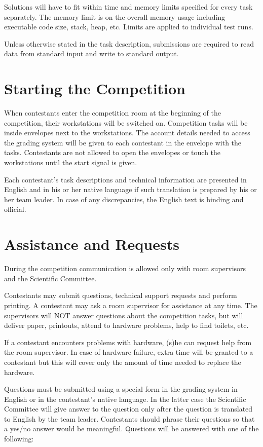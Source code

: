\documentclass[a5paper,10pt,twoside]{book}
\begin{document}
Solutions will have to fit within time and memory limits specified for every
task separately. The memory limit is on the overall memory usage including
executable code size, stack, heap, etc. Limits are applied to individual test
runs.

Unless otherwise stated in the task description, submissions are required to
read data from standard input and write to standard output.

\section{Starting the Competition}

When contestants enter the competition room at the beginning of the competition,
their workstations will be switched on. Competition tasks will be inside
envelopes next to the workstations. The account details needed to access the
grading system will be given to each contestant in the envelope with the tasks.
Contestants are not allowed to open the envelopes or touch the workstations
until the start signal is given.

Each contestant’s task descriptions and technical information are presented in
English and in his or her native language if such translation is prepared by his
or her team leader. In case of any discrepancies, the English text is binding
and official.

\section{Assistance and Requests}

During the competition communication is allowed only with room supervisors and
the Scientific Committee.

Contestants may submit questions, technical support requests and perform
printing. A contestant may ask a room supervisor for assistance at any time. The
supervisors will NOT answer questions about the competition tasks, but will
deliver paper, printouts, attend to hardware problems, help to find toilets,
etc.

If a contestant encounters problems with hardware, (s)he can request help from
the room supervisor. In case of hardware failure, extra time will be granted to
a contestant but this will cover only the amount of time needed to replace the
hardware.

Questions must be submitted using a special form in the grading system in
English or in the contestant's native language. In the latter case the
Scientific Committee will give answer to the question only after the question is
translated to English by the team leader. Contestants should phrase their
questions so that a yes/no answer would be meaningful. Questions will be
answered with one of the following:
\end{document}

